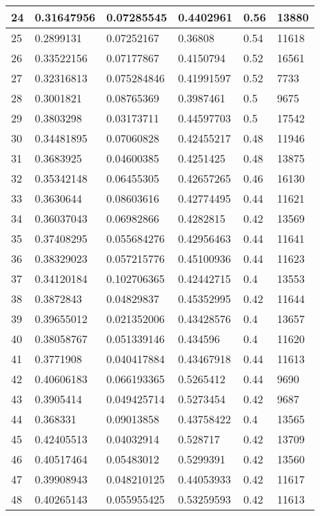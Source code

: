 \begin{longtable}{|l|l|l|l|l|l|}
24 & 0.31647956 & 0.07285545 & 0.4402961 & 0.56 & 13880 \\ \hline 
25 & 0.2899131 & 0.07252167 & 0.36808 & 0.54 & 11618 \\ \hline 
26 & 0.33522156 & 0.07177867 & 0.4150794 & 0.52 & 16561 \\ \hline 
27 & 0.32316813 & 0.075284846 & 0.41991597 & 0.52 & 7733 \\ \hline 
28 & 0.3001821 & 0.08765369 & 0.3987461 & 0.5 & 9675 \\ \hline 
29 & 0.3803298 & 0.03173711 & 0.44597703 & 0.5 & 17542 \\ \hline 
30 & 0.34481895 & 0.07060828 & 0.42455217 & 0.48 & 11946 \\ \hline 
31 & 0.3683925 & 0.04600385 & 0.4251425 & 0.48 & 13875 \\ \hline 
32 & 0.35342148 & 0.06455305 & 0.42657265 & 0.46 & 16130 \\ \hline 
33 & 0.3630644 & 0.08603616 & 0.42774495 & 0.44 & 11621 \\ \hline 
34 & 0.36037043 & 0.06982866 & 0.4282815 & 0.42 & 13569 \\ \hline 
35 & 0.37408295 & 0.055684276 & 0.42956463 & 0.44 & 11641 \\ \hline 
36 & 0.38329023 & 0.057215776 & 0.45100936 & 0.44 & 11623 \\ \hline 
37 & 0.34120184 & 0.102706365 & 0.42442715 & 0.4 & 13553 \\ \hline 
38 & 0.3872843 & 0.04829837 & 0.45352995 & 0.42 & 11644 \\ \hline 
39 & 0.39655012 & 0.021352006 & 0.43428576 & 0.4 & 13657 \\ \hline 
40 & 0.38058767 & 0.051339146 & 0.434596 & 0.4 & 11620 \\ \hline 
41 & 0.3771908 & 0.040417884 & 0.43467918 & 0.44 & 11613 \\ \hline 
42 & 0.40606183 & 0.066193365 & 0.5265412 & 0.44 & 9690 \\ \hline 
43 & 0.3905414 & 0.049425714 & 0.5273454 & 0.42 & 9687 \\ \hline 
44 & 0.368331 & 0.09013858 & 0.43758422 & 0.4 & 13565 \\ \hline 
45 & 0.42405513 & 0.04032914 & 0.528717 & 0.42 & 13709 \\ \hline 
46 & 0.40517464 & 0.05483012 & 0.5299391 & 0.42 & 13560 \\ \hline 
47 & 0.39908943 & 0.048210125 & 0.44053933 & 0.42 & 11617 \\ \hline 
48 & 0.40265143 & 0.055955425 & 0.53259593 & 0.42 & 11613 \\ \hline 

\end{longtable}
